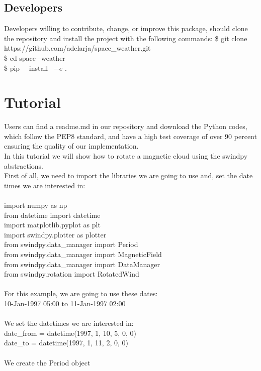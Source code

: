 \documentclass[baaa]{baaa}
\begin{document}
\subsection{Developers}    
Developers willing to contribute, change, or improve this package, should clone the repository and install the project with the following commands:
\$ git clone\\ https://github.com/adelarja/space\_weather.git\\
\$ cd space$-$weather\\
\$ pip \  \ install \ $-e$ .

\section{Tutorial}
Users can find a readme.md in our repository and download the Python codes, which follow the PEP8 standard, and have a high test coverage of over 90 percent ensuring the quality of our implementation.\\
In this tutorial we will show how to rotate a magnetic cloud using the swindpy abstractions.\\
First of all, we need to import the libraries we are going to use and, set the date times 
we are interested in:\\
\\
import numpy as np\\
from datetime import datetime\\
import matplotlib.pyplot as plt\\
import swindpy.plotter as plotter\\
from swindpy.data\_manager import Period\\
from swindpy.data\_manager import MagneticField\\
from swindpy.data\_manager import DataManager\\
from swindpy.rotation import RotatedWind\\
\\
For this example, we are going to use these dates:\\
10-Jan-1997 05:00 to 11-Jan-1997 02:00\\
\\
We set the datetimes we are interested in:\\
date\_from = datetime(1997, 1, 10, 5, 0, 0)\\
date\_to = datetime(1997, 1, 11, 2, 0, 0)\\
\\
We create the Period object\\
\end{document}
